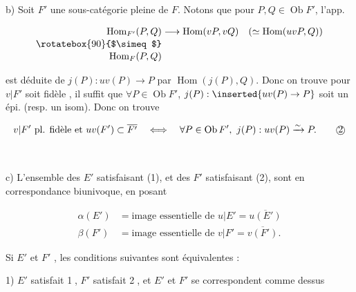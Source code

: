 
b) Soit $F'$ une sous-catégorie pleine de $F$. Notons que pour $P,Q\in\operatorname{Ob}F'$, l'app.

\[
\begin{aligned}
\operatorname{Hom}_{F'}(P,Q)&\longrightarrow\operatorname{Hom}(vP,vQ)\quad(\simeq\operatorname{Hom}(uvP,Q))\\[-2pt]
\rotatebox{90}{$\simeq$}&\\[-2pt]\operatorname{Hom}_{F}(P,Q)&
\end{aligned}
\]

est déduite de $j(P):uv(P)\longrightarrow P$ par $\operatorname{Hom}(j(P),Q)$. Donc on trouve pour  $v|F'$ soit fidèle , il suffit que $\forall P\in\operatorname{Ob}F'$, $j(P):\inserted{uv(P)\to P}$ soit un épi. (resp. un isom). Donc on trouve

\[
v|F'\ \text{pl. fidèle et }uv(F')\subset\overline{F'}\quad\Longleftrightarrow\quad
\forall P\in\operatorname{Ob}F',\ j(P):uv(P)\xrightarrow{\sim}P.\tag*{\textcircled{2}}\]

\\

c) L'ensemble des $E'$  satisfaisant (1), et des $F'$  satisfaisant (2), sont en correspondance biunivoque, en posant

\[
\begin{aligned}
\alpha(E')&=\text{image essentielle de }u|E'=\overline{u(E')}\\
\beta(F')&=\text{image essentielle de }v|F'=\overline{v(F')}.
\end{aligned}
\]

Si $E'$ et $F'$ , les conditions suivantes sont équivalentes :

1) $E'$ satisfait \textcircled{1}, $F'$ satisfait \textcircled{2}, et $E'$ et $F'$ se correspondent comme dessus

